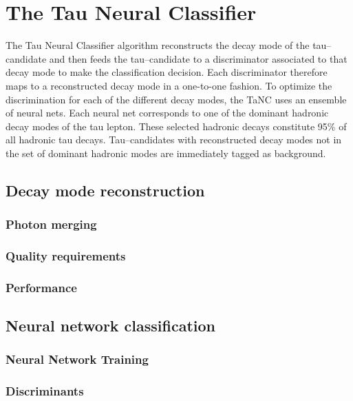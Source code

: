 \section{The Tau Neural Classifier}
\label{sec:Tanc}
%
The Tau Neural Classifier algorithm reconstructs the decay mode of the
tau--candidate and then feeds the tau--candidate to a discriminator associated
to that decay mode to make the classification decision.  Each discriminator
therefore maps to a reconstructed decay mode in a one-to-one fashion.  To
optimize the discrimination for each of the different decay modes, the TaNC uses
an ensemble of neural nets.  Each neural net corresponds to one of the dominant
hadronic decay modes of the tau lepton.  These selected hadronic decays
constitute 95\% of all hadronic tau decays.  Tau--candidates with reconstructed
decay modes not in the set of dominant hadronic modes are immediately tagged as
background.  

\subsection{Decay mode reconstruction}
\label{sec:decay_mode_reco}

\subsubsection{Photon merging}

\subsubsection{Quality requirements}

\subsubsection{Performance}


\subsection{Neural network classification}
\subsubsection{Neural Network Training}
\label{sec:tanc_nn_training}

\subsubsection{Discriminants}
\label{sec:tanc_nn_discriminants}

